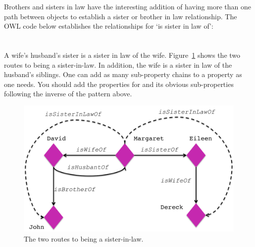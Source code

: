 Brothers and sisters in law have the interesting addition of having more than one path between objects to establish a sister or brother in law relationship. The OWL code below establishes the relationships for `is sister in law of':
\\\\
\\
A wife's husband's sister is a sister in law of the wife. Figure~\ref{fig:sister-in-law} shows the two routes to being a sister-in-law. In addition, the wife is a sister in law of the husband's siblings. One can add as many sub-property chains to a property as one needs. You should add the properties for  and its obvious sub-properties following the inverse of the pattern above.


\begin{figure}
\begin{center}
\includegraphics[width=\figwidth]{figures/sister_in_law}
\caption{The two routes to being a sister-in-law.}
\label{fig:sister-in-law}
\end{center}
\end{figure}

